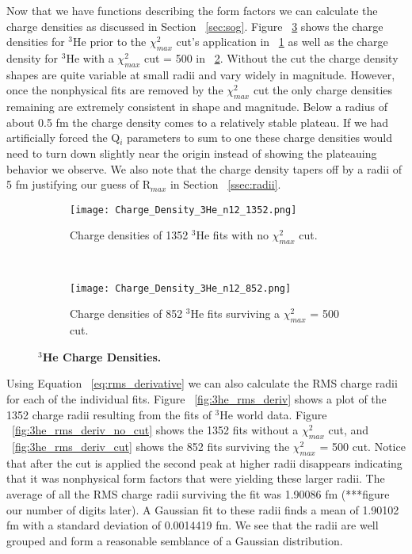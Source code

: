 Now that we have functions describing the form factors we can calculate the charge densities as discussed in Section ~\ref{sec:sog}. Figure ~\ref{fig:3he_charge_density} shows the charge densities for $^3$He prior to the $\chi^2_{max}$ cut's application in ~\ref{fig:3he_charge_density_no_cut} as well as the charge density for $^3$He with a $\chi^2_{max}$ cut = 500 in ~\ref{fig:3he_charge_density_cut}. Without the cut the charge density shapes are quite variable at small radii and vary widely in magnitude. However, once the nonphysical fits are removed by the $\chi^2_{max}$ cut the only charge densities remaining are extremely consistent in shape and magnitude. Below a radius of about 0.5 fm the charge density comes to a relatively stable plateau. If we had artificially forced the Q$_i$ parameters to sum to one these charge densities would need to turn down slightly near the origin instead of showing the plateauing behavior we observe. We also note that the charge density tapers off by a radii of 5 fm justifying our guess of R$_{max}$ in Section ~\ref{ssec:radii}.

\begin{figure}[!ht]
\begin{subfigure}{1.\textwidth}
  \centering
  \texttt{[image: Charge\_Density\_3He\_n12\_1352.png]}
  \caption{Charge densities of 1352 $^3$He fits with no $\chi^2_{max}$ cut.}
  \label{fig:3he_charge_density_no_cut}
\end{subfigure}\\
\begin{subfigure}{1.\textwidth}
  \centering
  \texttt{[image: Charge\_Density\_3He\_n12\_852.png]}
  \caption{Charge densities of 852 $^3$He fits surviving a $\chi^2_{max}$ = 500 cut.}
  \label{fig:3he_charge_density_cut}
\end{subfigure}
\caption{\bf{$^3$He Charge Densities.}}
\label{fig:3he_charge_density}
\end{figure}

Using Equation ~\ref{eq:rms_derivative} we can also calculate the RMS charge radii for each of the individual fits. Figure ~\ref{fig:3he_rms_deriv} shows a plot of the 1352 charge radii resulting from the fits of $^3$He world data. Figure ~\ref{fig:3he_rms_deriv_no_cut} shows the 1352 fits without a $\chi^2_{max}$ cut, and ~\ref{fig:3he_rms_deriv_cut} shows the 852 fits surviving the $\chi^2_{max}$ = 500 cut. Notice that after the cut is applied the second peak at higher radii disappears indicating that it was nonphysical form factors that were yielding these larger radii. The average of all the RMS charge radii surviving the fit was 1.90086 fm (***figure our number of digits later). A Gaussian fit to these radii finds a mean of 1.90102 fm with a standard deviation of 0.0014419 fm. We see that the radii are well grouped and form a reasonable semblance of a Gaussian distribution.

